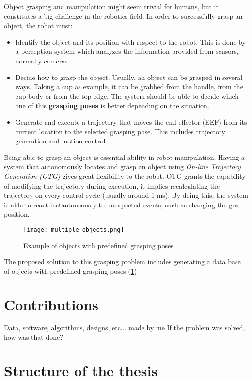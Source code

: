 Object grasping and manipulation might seem trivial for humans, but it constitutes a big challenge in the robotics field. In order to successfully grasp an object, the robot must:
\begin{itemize}
	\item Identify the object and its position with respect to the robot. This is done by a perception system which analyzes the information provided from sensors, normally cameras.
	\item Decide how to grasp the object. Usually, an object can be grasped in several ways. Taking a cup as example, it can be grabbed from the handle, from the cup body or from the top edge. The system should be able to decide which one of this \textbf{grasping poses} is better depending on the situation.
	\item Generate and execute a trajectory that moves the end effector (EEF) from its current location to the selected grasping pose. This includes trajectory generation and motion control.
\end{itemize}

Being able to grasp an object is essential ability in robot manipulation. Having a system that autonomously locates and grasp an object using \textit{On-line Trajectory Generation (OTG)} gives great flexibility to the robot. OTG grants the capability of modifying the trajectory during execution, it implies recalculating the trajectory on every control cycle (usually around 1 ms). By doing this, the system is able to react instantaneously to unexpected events, such as changing the goal position.

\begin{figure}[H]
	\centering
	\texttt{[image: multiple\_objects.png]}
	\vspace{-10pt}
	\caption{Example of objects with predefined grasping poses}
	\vspace{-15pt}
	\label{fig:obj_grasp_pose}
\end{figure}

The proposed solution to this grasping problem includes generating a data base of objects with predefined grasping poses (\ref{fig:obj_grasp_pose})



\section{Contributions}
Data, software, algorithms, designs, etc... made by me
If the problem was solved, how was that done?

\section{Structure of the thesis}


